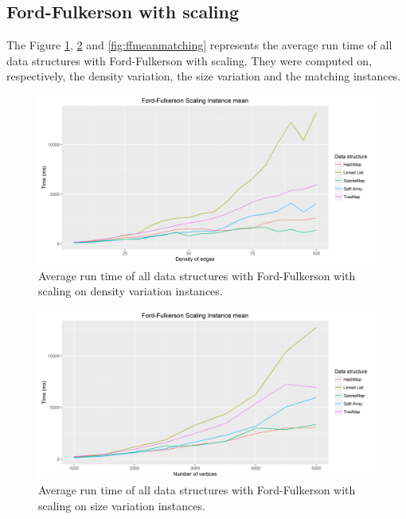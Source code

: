 \subsection{Ford-Fulkerson with scaling}
The Figure \ref{fig:ffmeandensity}, \ref{fig:ffmeansize} and \ref{fig:ffmeanmatching} represents the average run time of all data structures with Ford-Fulkerson with scaling. They were computed on, respectively, the density variation, the size variation and the matching instances.
\begin{figure}[H]
\begin{center}
\includegraphics[scale=0.5]{images/ffmeandensity.png}
\caption{Average run time of all data structures with Ford-Fulkerson with scaling on density variation instances.}
\label{fig:ffmeandensity}
\end{center}
\end{figure}
\begin{figure}[H]
\begin{center}
\includegraphics[scale=0.5]{images/ffmeansize2.png}
\caption{Average run time of all data structures with Ford-Fulkerson with scaling on size variation instances.}
\label{fig:ffmeansize}
\end{center}
\end{figure}
